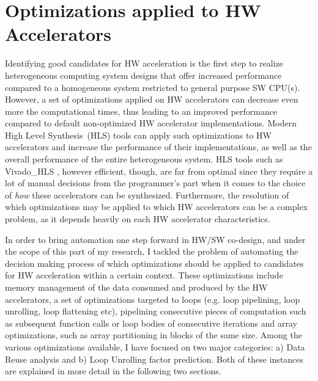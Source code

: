\documentclass[]{usiinfthesis}
\newcommand{\HLS}{{High Level Synthesis}}
\begin{document}



%
%
%
%
%  
%
%
%
%
%

\chapter{Optimizations applied to HW Accelerators}

Identifying good candidates for HW acceleration is the first step to realize heterogeneous
computing system designs that offer increased performance compared to a homogeneous system restricted
to general purpose SW CPU(s). However, a set of optimizations applied on HW accelerators can decrease 
even more the computational times, thus leading to an improved performance compared to default
non-optimized HW accelerator implementations. 
Modern \HLS\ (HLS) tools can apply such optimizations to 
HW accelerators and increase the performance of their implementations, as well as the overall performance 
of the entire heterogeneous system.
HLS tools such as Vivado\_HLS  \cite{VivadoHLSMar17}, however efficient, though, are far from 
optimal since they require a lot of manual decisions from the programmer's part when it comes to the
choice of {\em how} these accelerators can be synthesized.
Furthermore, the resolution of which optimizations may be applied to which HW accelerators can be a 
complex problem, as it depends heavily on each HW accelerator characteristics.\par

In order to bring automation one step forward in HW/SW co-design, and under the scope of this part of my 
research, I tackled the problem of automating the decision making process of which optimizations should be 
applied to candidates for HW acceleration within a certain context. 
These optimizations include memory management of the data consumed and produced by the HW accelerators, 
a set of optimizations targeted to loops (e.g. loop pipelining, loop unrolling, loop flattening etc), 
pipelining consecutive pieces of computation such as subsequent function calls or loop bodies of consecutive 
iterations and array optimizations, such as array partitioning in blocks of the same size. Among the various 
optimizations available, I have focused on two major categories: a) Data Reuse analysis and b) Loop Unrolling 
factor prediction. Both of these instances are explained in more detail in the following two sections.
\end{document}
